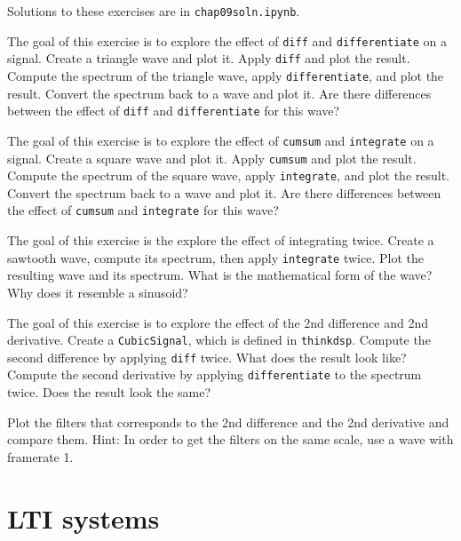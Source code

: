 \documentclass[12pt]{book} \usepackage[width=5.5in,height=8.5in, hmarginratio=3:2,vmarginratio=1:1]{geometry}
\begin{document}
Solutions to these exercises are in {\tt chap09soln.ipynb}. 

\begin{exercise} The goal of this exercise is to explore the effect of {\tt diff} and {\tt differentiate} on a signal. Create a triangle wave and plot it. Apply {\tt diff} and plot the result. Compute the spectrum of the triangle wave, apply {\tt differentiate}, and plot the result. Convert the spectrum back to a wave and plot it. Are there differences between the effect of {\tt diff} and {\tt differentiate} for this wave? \end{exercise} 

\begin{exercise} The goal of this exercise is to explore the effect of {\tt cumsum} and {\tt integrate} on a signal. Create a square wave and plot it. Apply {\tt cumsum} and plot the result. Compute the spectrum of the square wave, apply {\tt integrate}, and plot the result. Convert the spectrum back to a wave and plot it. Are there differences between the effect of {\tt cumsum} and {\tt integrate} for this wave? \end{exercise} 

\begin{exercise} The goal of this exercise is the explore the effect of integrating twice. Create a sawtooth wave, compute its spectrum, then apply {\tt integrate} twice. Plot the resulting wave and its spectrum. What is the mathematical form of the wave? Why does it resemble a sinusoid? \end{exercise} 

\begin{exercise} The goal of this exercise is to explore the effect of the 2nd difference and 2nd derivative. Create a {\tt CubicSignal}, which is defined in {\tt thinkdsp}. Compute the second difference by applying {\tt diff} twice. What does the result look like? Compute the second derivative by applying {\tt differentiate} to the spectrum twice. Does the result look the same? 

Plot the filters that corresponds to the 2nd difference and the 2nd derivative and compare them. Hint: In order to get the filters on the same scale, use a wave with framerate 1. \end{exercise} 

\chapter{LTI systems} \label{systems} 
\end{document}

